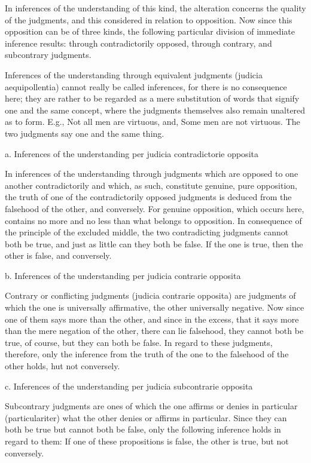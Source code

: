 In inferences of the understanding of this kind,
the alteration concerns the quality of the judgments,
and this considered in relation to opposition.
Now since this opposition can be of three kinds,
the following particular division of immediate inference results:
through contradictorily opposed, through contrary, and subcontrary judgments.

    Inferences of the understanding through equivalent judgments
    (judicia aequipollentia) cannot really be called inferences,
    for there is no consequence here;
    they are rather to be regarded as a mere substitution of words
    that signify one and the same concept, where the judgments themselves
    also remain unaltered as to form.
    E.g., Not all men are virtuous, and, Some men are not virtuous.
    The two judgments say one and the same thing.

a. Inferences of the understanding per judicia contradictorie opposita

In inferences of the understanding through judgments which are opposed
to one another contradictorily and which, as such, constitute genuine,
pure opposition, the truth of one of the contradictorily opposed judgments
is deduced from the falsehood of the other, and conversely.
For genuine opposition, which occurs here, contains no more and no less than what
belongs to opposition.
In consequence of the principle of the excluded middle,
the two contradicting judgments cannot both be true,
and just as little can they both be false.
If the one is true, then the other is false, and conversely.

b. Inferences of the understanding per judicia contrarie opposita

Contrary or conflicting judgments (judicia contrarie opposita) are judgments of which
the one is universally affirmative, the other universally negative.
Now since one of them says more than the other, and since in the excess,
that it says more than the mere negation of the other,
there can lie falsehood, they cannot both be true, of course,
but they can both be false.
In regard to these judgments, therefore, only the inference
from the truth of the one to the falsehood of the other holds, hut not conversely.

c. Inferences of the understanding per judicia subcontrarie opposita

Subcontrary judgments are ones of which the one affirms or denies
in particular (particulariter) what the other denies or affirms in particular.
Since they can both be true but cannot both be false,
only the following inference holds in regard to them:
If one of these propositions is false, the other is true, but not conversely.

